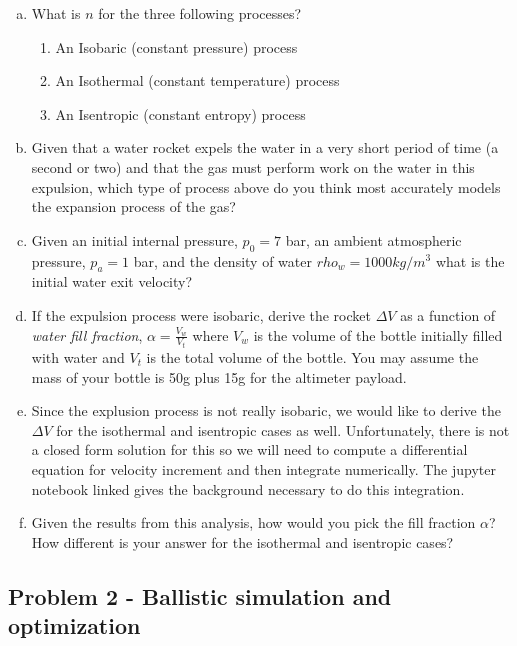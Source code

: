 \documentclass[]{memoir} %
\begin{document}
\begin{enumerate}[a)]
    \item What is $n$ for the three following processes?

    \begin{enumerate}
        \item An Isobaric (constant pressure) process
        \item An Isothermal (constant temperature) process
        \item An Isentropic (constant entropy) process
    \end{enumerate}

    \item Given that a water rocket expels the water in a very short period of time (a second or two) and
            that the gas must perform work on the water in this expulsion, which type of process above do you
            think most accurately models the expansion process of the gas?

    \item Given an initial internal pressure, $p_0 = 7$ bar, an ambient atmospheric pressure, $p_a = 1$ bar,
        and the density of water $rho_w = 1000 kg/m^3$ what is the initial water exit velocity?

    \item If the expulsion process were isobaric, derive the rocket $\Delta V$ as a function of \emph{water
        fill fraction}, $\alpha = \frac{V_w}{V_t}$ where $V_w$ is the volume of the bottle initially filled
        with water and $V_t$ is the total volume of the bottle.  You may assume the mass of your bottle is
        50g plus 15g for the altimeter payload.

    \item Since the explusion process is not really isobaric, we would like to derive the $\Delta V$ for
        the isothermal and isentropic cases as well. Unfortunately, there is not a closed form solution
        for this so we will need to compute a differential equation for velocity increment and then 
        integrate numerically.  The jupyter notebook linked gives the background necessary to do this integration.

    \item Given the results from this analysis, how would you pick the fill fraction $\alpha$?  How different
        is your answer for the isothermal and isentropic cases?
\end{enumerate}

\subsection{Problem 2 - Ballistic simulation and optimization}
\end{document}
